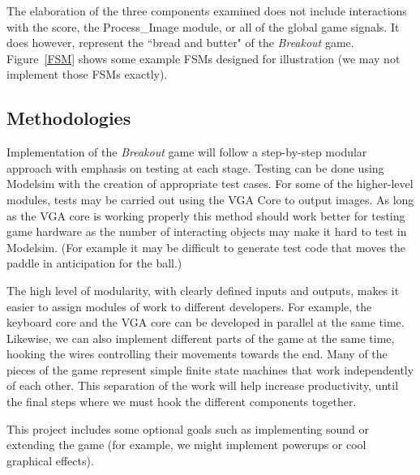 \documentclass[conference]{IEEEtran}
\begin{document}
The elaboration of the three components examined does not include interactions with the score, the Process\_Image module, or all of the global game signals. It does however, represent the ``bread and butter" of the \emph{Breakout} game. Figure~\ref{FSM} shows some example FSMs designed for illustration (we may not implement those FSMs exactly).

\subsection{Methodologies}
Implementation of the \emph{Breakout} game will follow a step-by-step modular approach with emphasis on testing at each stage. Testing can be done using Modelsim with the creation of appropriate test cases. For some of the higher-level modules, tests may be carried out using the VGA Core to output images. As long as the VGA core is working properly this method should work better for testing game hardware as the number of interacting objects may make it hard to test in Modelsim. (For example it may be difficult to generate test code that moves the paddle in anticipation for the ball.)

The high level of modularity, with clearly defined inputs and outputs, makes it easier to assign modules of work to different developers. For example, the keyboard core and the VGA core can be developed in parallel at the same time. Likewise, we can also implement different parts of the game at the same time, hooking the wires controlling their movements towards the end. Many of the pieces of the game represent simple finite state machines that work independently of each other. This separation of the work will help increase productivity, until the final steps where we must hook the different components together.

This project includes some optional goals such as implementing sound or extending the game (for example, we might implement powerups or cool graphical effects).
\end{document}
